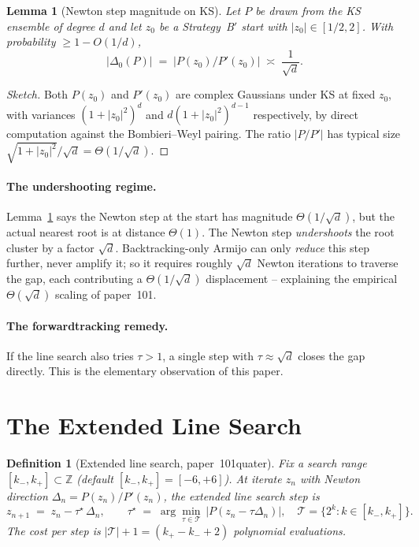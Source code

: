 \documentclass[11pt,a4paper]{article}
\newtheorem{lemma}[theorem]{Lemma}
\newtheorem{definition}[theorem]{Definition}
\begin{document}
\begin{lemma}[Newton step magnitude on KS]\label{lem:newton-magnitude}
Let $P$ be drawn from the KS ensemble of degree $d$ and let $z_0$ be a Strategy~B$'$ start with $|z_0| \in [1/2, 2]$. With probability $\ge 1 - O(1/d)$,
\begin{equation}\label{eq:beta-typical}
|\Delta_0(P)| \;=\; |P(z_0)/P'(z_0)| \;\asymp\; \frac{1}{\sqrt{d}}.
\end{equation}
\end{lemma}

\begin{proof}[Sketch]
Both $P(z_0)$ and $P'(z_0)$ are complex Gaussians under KS at fixed $z_0$, with variances $(1 + |z_0|^2)^d$ and $d(1+|z_0|^2)^{d-1}$ respectively, by direct computation against the Bombieri--Weyl pairing. The ratio $|P/P'|$ has typical size $\sqrt{1+|z_0|^2}/\sqrt{d} = \Theta(1/\sqrt{d})$.
\end{proof}

\paragraph{The undershooting regime.} Lemma~\ref{lem:newton-magnitude} says the Newton step at the start has magnitude $\Theta(1/\sqrt d)$, but the actual nearest root is at distance $\Theta(1)$. The Newton step \emph{undershoots} the root cluster by a factor $\sqrt d$. Backtracking-only Armijo can only \emph{reduce} this step further, never amplify it; so it requires roughly $\sqrt d$ Newton iterations to traverse the gap, each contributing a $\Theta(1/\sqrt d)$ displacement -- explaining the empirical $\Theta(\sqrt d)$ scaling of paper~101.

\paragraph{The forwardtracking remedy.} If the line search also tries $\tau > 1$, a single step with $\tau \approx \sqrt d$ closes the gap directly. This is the elementary observation of this paper.

\section{The Extended Line Search}\label{sec:extended}

\begin{definition}[Extended line search, paper~101quater]\label{def:extended-LS}
Fix a search range $[k_-, k_+] \subset \mathbb{Z}$ (default $[k_-, k_+] = [-6, +6]$). At iterate $z_n$ with Newton direction $\Delta_n = P(z_n)/P'(z_n)$, the \emph{extended line search} step is
\begin{equation}\label{eq:extended-step}
z_{n+1} \;=\; z_n - \tau^{\star}\, \Delta_n, \qquad
\tau^{\star} \;=\; \arg\min_{\tau \in \mathcal{T}}\,\bigl|P(z_n - \tau \Delta_n)\bigr|, \quad
\mathcal{T} = \{2^{k} : k \in [k_-, k_+]\}.
\end{equation}
The cost per step is $|\mathcal{T}| + 1 = (k_+ - k_- + 2)$ polynomial evaluations.
\end{definition}
\end{document}
